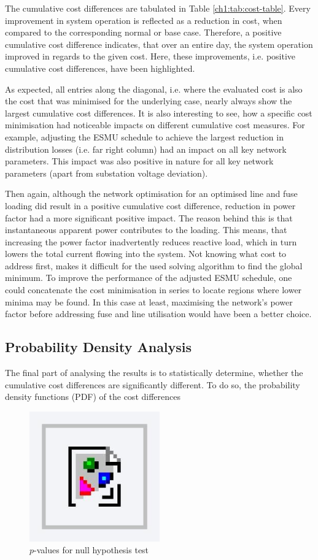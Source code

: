 

The cumulative cost differences are tabulated in Table \ref{ch1:tab:cost-table}.
Every improvement in system operation is reflected as a reduction in cost, when compared to the corresponding normal or base case.
Therefore, a positive cumulative cost difference indicates, that over an entire day, the system operation improved in regards to the given cost.
Here, these improvements, i.e. positive cumulative cost differences, have been highlighted.

As expected, all entries along the diagonal, i.e. where the evaluated cost is also the cost that was minimised for the underlying case, nearly always show the largest cumulative cost differences.
It is also interesting to see, how a specific cost minimisation had noticeable impacts on different cumulative cost measures.
For example, adjusting the ESMU schedule to achieve the largest reduction in distribution losses (i.e. far right column) had an impact on all key network parameters.
This impact was also positive in nature for all key network parameters (apart from substation voltage deviation).

Then again, although the network optimisation for an optimised line and fuse loading did result in a positive cumulative cost difference, reduction in power factor had a more significant positive impact.
The reason behind this is that instantaneous apparent power contributes to the loading.
This means, that increasing the power factor inadvertently reduces reactive load, which in turn lowers the total current flowing into the system.
Not knowing what cost to address first, makes it difficult for the used solving algorithm to find the global minimum.
To improve the performance of the adjusted ESMU schedule, one could concatenate the cost minimisation in series to locate regions where lower minima may be found.
In this case at least, maximising the network's power factor before addressing fuse and line utilisation would have been a better choice.

\subsection{Probability Density Analysis}
\label{ch1:subsec:probability-density-analysis}

The final part of analysing the results is to statistically determine, whether the cumulative cost differences are significantly different.
To do so, the probability density functions (PDF) of the  cost differences 

\begin{figure}\centering
	\includegraphics[width=0.5\textwidth]{foo}
\caption{$p$-values for null hypothesis test}
\end{figure}
%